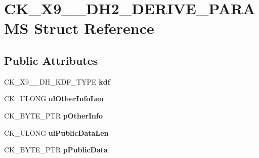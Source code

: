 \hypertarget{struct_c_k___x9__42___d_h2___d_e_r_i_v_e___p_a_r_a_m_s}{}\section{C\+K\+\_\+\+X9\+\_\+\_\+\+D\+H2\+\_\+\+D\+E\+R\+I\+V\+E\+\_\+\+P\+A\+R\+A\+MS Struct Reference}
\label{struct_c_k___x9__42___d_h2___d_e_r_i_v_e___p_a_r_a_m_s}
\subsection*{Public Attributes}
\begin{DoxyCompactItemize}
\item 
\mbox{\label{struct_c_k___x9__42___d_h2___d_e_r_i_v_e___p_a_r_a_m_s_a6d3cf6b96eda8e41dc4c6db2abd81349}} 
C\+K\+\_\+\+X9\+\_\+\_\+\+D\+H\+\_\+\+K\+D\+F\+\_\+\+T\+Y\+PE {\bfseries kdf}
\item 
\mbox{\label{struct_c_k___x9__42___d_h2___d_e_r_i_v_e___p_a_r_a_m_s_a3bf3945ee7b383dfbe685b21889a81ab}} 
C\+K\+\_\+\+U\+L\+O\+NG {\bfseries ul\+Other\+Info\+Len}
\item 
\mbox{\label{struct_c_k___x9__42___d_h2___d_e_r_i_v_e___p_a_r_a_m_s_a89a408d59508d860d85d3bdabe795032}} 
C\+K\+\_\+\+B\+Y\+T\+E\+\_\+\+P\+TR {\bfseries p\+Other\+Info}
\item 
\mbox{\label{struct_c_k___x9__42___d_h2___d_e_r_i_v_e___p_a_r_a_m_s_aa0febd1df79f3897d0f54874862d0617}} 
C\+K\+\_\+\+U\+L\+O\+NG {\bfseries ul\+Public\+Data\+Len}
\item 
\mbox{\label{struct_c_k___x9__42___d_h2___d_e_r_i_v_e___p_a_r_a_m_s_a4e56e3e9f4edb37ade17e8c3ac34f816}} 
C\+K\+\_\+\+B\+Y\+T\+E\+\_\+\+P\+TR {\bfseries p\+Public\+Data}
\item 
\mbox{\label{struct_c_k___x9__42___d_h2___d_e_r_i_v_e___p_a_r_a_m_s_a3247f97e7f094da2808e5a398c4573af}} 

\end{DoxyCompactItemize}
